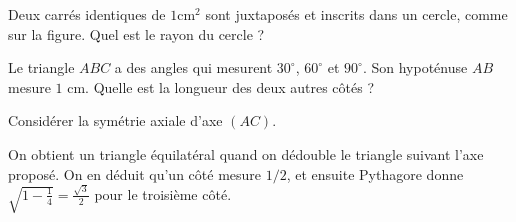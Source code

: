 \begin{exo}
Deux carrés identiques de $1\mathrm{cm}^2$ sont juxtaposés et inscrits dans un cercle, comme sur la figure.
Quel est le rayon du cercle ?
\begin{center}
\end{center}
\begin{hint}

\end{hint}
\begin{sol}

\end{sol}
\end{exo}





\begin{exo}
Le triangle $ABC$ a des angles qui mesurent $30^\circ$, $60^\circ$ et $90^\circ$.
Son hypoténuse $AB$ mesure $1$ cm.
Quelle est la longueur des deux autres côtés ?
\begin{center}
\end{center}
\begin{hint}
Considérer la symétrie axiale d'axe $(AC)$.
\end{hint}
\begin{sol}
On obtient un triangle équilatéral quand on dédouble le triangle suivant l'axe proposé. On en déduit qu'un côté mesure $1/2$, et ensuite Pythagore donne $\sqrt{1-\frac14} = \frac{\sqrt 3}{2}$ pour le troisième côté.
\end{sol}
\end{exo}





